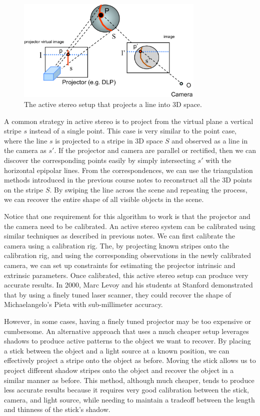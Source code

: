 \documentclass[a4paper, 12pt]{article}
\numberwithin{equation}{section}
\begin{document}
\begin{figure}[h!]
    \centering
    \includegraphics[width = 0.8\textwidth]{figures/active_stereo_line.png}
    \caption{The active stereo setup that projects a line into 3D space.}
    \label{fig:active_stereo_line}
\end{figure}

A common strategy in active stereo is to project from the virtual plane a vertical stripe $s$ instead of a single point. This case is very similar to the point case, where the line $s$ is projected to a stripe in 3D space $S$ and observed as a line in the camera as $s'$. If the projector and camera are parallel or rectified, then we can discover the corresponding points easily by simply intersecting $s'$ with the horizontal epipolar lines. From the correspondences, we can use the triangulation methods introduced in the previous course notes to reconstruct all the 3D points on the stripe $S$. By swiping the line across the scene and repeating the process, we can recover the entire shape of all visible objects in the scene. 

Notice that one requirement for this algorithm to work is that the projector and the camera need to be calibrated. An active stereo system can be calibrated using similar techniques as described in previous notes. We can first calibrate the camera using a calibration rig. The, by projecting known stripes onto the calibration rig, and using the corresponding observations in the newly calibrated camera, we can set up constraints for estimating the projector intrinsic and extrinsic parameters. Once calibrated, this active stereo setup can produce very accurate results. In 2000, Marc Levoy and his students at Stanford demonstrated that by using a finely tuned laser scanner, they could recover the shape of Michaelangelo's Pieta with sub-millimeter accuracy.

However, in some cases, having a finely tuned projector may be too expensive or cumbersome. An alternative approach that uses a much cheaper setup leverages shadows to produce active patterns to the object we want to recover. By placing a stick between the object and a light source at a known position, we can effectively project a stripe onto the object as before. Moving the stick allows us to project different shadow stripes onto the object and recover the object in a similar manner as before. This method, although much cheaper, tends to produce less accurate results because it requires very good calibration between the stick, camera, and light source, while needing to maintain a tradeoff between the length and thinness of the stick's shadow.
\end{document}
